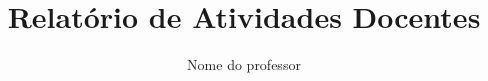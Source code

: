 \documentclass[a4paper,12pt,oneside,brazil]{doccv}
\title{Relatório de Atividades Docentes}
\author{Nome do professor}
\begin{document}

\frontmatter
\maketitle


\mainmatter
\tableofcontents





\appendix{}

\end{document}
